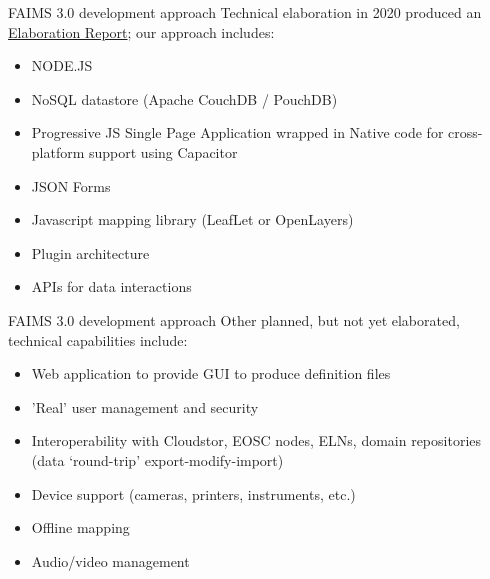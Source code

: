 \documentclass[
	aspectratio=169, %
	12pt, %
	t, %
]{beamer}
\begin{document}
\begin{refsegment}
\begin{frame}{FAIMS 3.0 development approach}
Technical elaboration in 2020 produced an \href{https://zenodo.org/record/4616766}{Elaboration Report}; our approach includes:
    \begin{itemize}
        \item NODE.JS
        \item NoSQL datastore (Apache CouchDB / PouchDB)
        \item Progressive JS Single Page Application wrapped in Native code
for cross-platform support using Capacitor
        \item JSON Forms
        \item Javascript mapping library (LeafLet or OpenLayers)
        \item Plugin architecture
        \item APIs for data interactions

    \end{itemize}
\end{frame}


\begin{frame}{FAIMS 3.0 development approach}
Other planned, but not yet elaborated, technical capabilities include:
    \begin{itemize}
        \item Web application to provide GUI to produce definition files
        \item 'Real' user management and security
        \item Interoperability with Cloudstor, EOSC nodes, ELNs, domain repositories (data `round-trip' export-modify-import)
        \item Device support (cameras, printers, instruments, etc.)
        \item Offline mapping
        \item Audio/video management
    \end{itemize}
\end{frame}



\end{refsegment}
\end{document}
